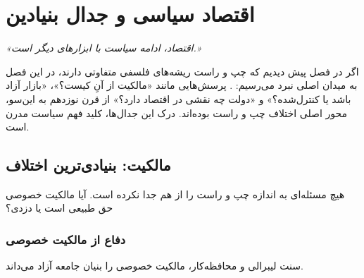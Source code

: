 
\chapter{اقتصاد سیاسی و جدال بنیادین}
\label{ch:political-economy}

\begin{flushright}
\textit{«اقتصاد، ادامه سیاست با ابزارهای دیگر است.»}
\end{flushright}


\lettrine[lines=3, lraise=0.1, nindent=0.5em]{\textcolor{CenterGreen}{ا}}{گر} 
در فصل پیش دیدیم که چپ و راست ریشه‌های فلسفی متفاوتی دارند، در این فصل به میدان اصلی نبرد می‌رسیم: . پرسش‌هایی مانند «مالکیت از آنِ کیست؟»، «بازار آزاد باشد یا کنترل‌شده؟» و «دولت چه نقشی در اقتصاد دارد؟» از قرن نوزدهم به این‌سو، محور اصلی اختلاف چپ و راست بوده‌اند. درک این جدال‌ها، کلید فهم سیاست مدرن است.

\section{مالکیت: بنیادی‌ترین اختلاف}

هیچ مسئله‌ای به اندازه  چپ و راست را از هم جدا نکرده است. آیا مالکیت خصوصی حق طبیعی است یا دزدی؟

\subsection{دفاع از مالکیت خصوصی}

سنت لیبرالی و محافظه‌کار، مالکیت خصوصی را بنیان جامعه آزاد می‌داند.

